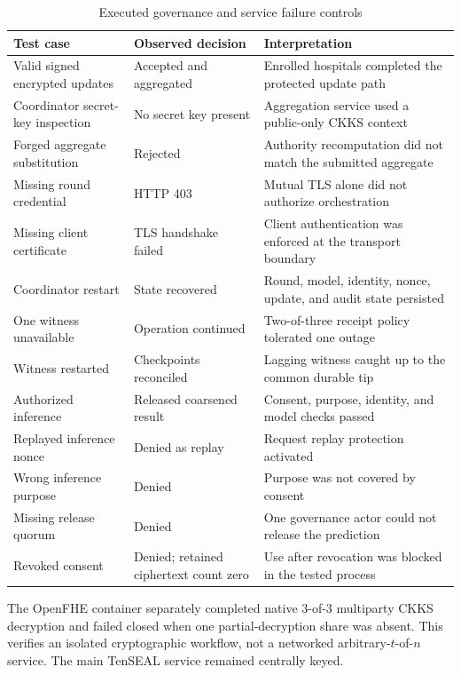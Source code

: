 \begin{table}[htbp]
    \centering
    \caption{Executed governance and service failure controls}
    \label{tab:service-controls}
    \begin{tabularx}{\textwidth}{@{}p{4.0cm}p{3.0cm}X@{}}
        \toprule
        Test case & Observed decision & Interpretation \\
        \midrule
        Valid signed encrypted updates & Accepted and aggregated & Enrolled hospitals completed the protected update path \\
        Coordinator secret-key inspection & No secret key present & Aggregation service used a public-only CKKS context \\
        Forged aggregate substitution & Rejected & Authority recomputation did not match the submitted aggregate \\
        Missing round credential & HTTP 403 & Mutual TLS alone did not authorize orchestration \\
        Missing client certificate & TLS handshake failed & Client authentication was enforced at the transport boundary \\
        Coordinator restart & State recovered & Round, model, identity, nonce, update, and audit state persisted \\
        One witness unavailable & Operation continued & Two-of-three receipt policy tolerated one outage \\
        Witness restarted & Checkpoints reconciled & Lagging witness caught up to the common durable tip \\
        Authorized inference & Released coarsened result & Consent, purpose, identity, and model checks passed \\
        Replayed inference nonce & Denied as replay & Request replay protection activated \\
        Wrong inference purpose & Denied & Purpose was not covered by consent \\
        Missing release quorum & Denied & One governance actor could not release the prediction \\
        Revoked consent & Denied; retained ciphertext count zero & Use after revocation was blocked in the tested process \\
        \bottomrule
    \end{tabularx}
\end{table}

The OpenFHE container separately completed native 3-of-3 multiparty CKKS decryption and failed closed when one partial-decryption share was absent. This verifies an isolated cryptographic workflow, not a networked arbitrary-$t$-of-$n$ service. The main TenSEAL service remained centrally keyed.

